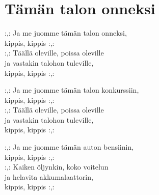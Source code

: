 \section{Tämän talon onneksi}

:,: Ja me juomme tämän talon onneksi,\\
kippis, kippis :,:\\
:,: Täällä oleville, poissa oleville\\
ja vastakin talohon tuleville,\\
kippis, kippis :,:


:,: Ja me juomme tämän talon konkurssiin,\\
kippis, kippis :,:\\
:,: Täällä oleville, poissa oleville\\
ja vastakin talohon tuleville,\\
kippis, kippis :,:


:,: Ja me juomme tämän auton bensiinin,\\
kippis, kippis :,:\\
:,: Kaiken öljynkin, koko voitelun\\
ja helavita akkumalaattorin,\\
kippis, kippis :,: